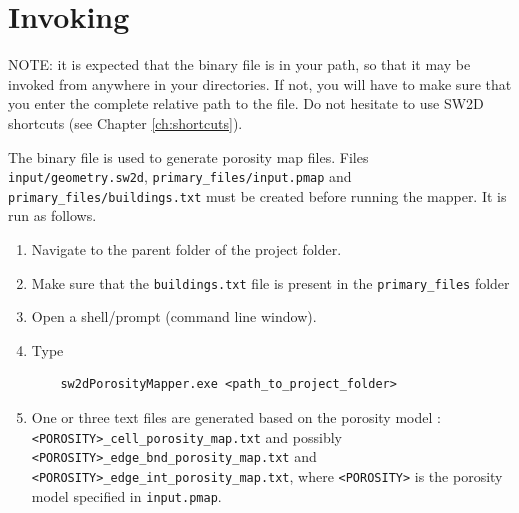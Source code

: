 \section{Invoking \swPorosityMapper}
NOTE: it is expected that the binary file \swPorosityMapper is in your path, so that it may be invoked from anywhere in your directories. If not, you will have to make sure that you enter the complete relative path to the \swPorosityMapper file. Do not hesitate to use SW2D shortcuts (see Chapter \ref{ch:shortcuts}).

The \swPorosityMapper binary file is used to generate porosity map files.
Files \texttt{input/geometry.sw2d}, \texttt{primary\_files/input.pmap} and \texttt{primary\_files/buildings.txt} must be created before running the mapper.
It is run as follows.

\begin{enumerate}
	\item Navigate to the parent folder of the \swdd project folder.
	\item Make sure that the \texttt{buildings.txt} file is present in the \texttt{primary\_files} folder
	\item Open a shell/prompt (command line window).
	\item Type
	\begin{verbatim}
	sw2dPorosityMapper.exe <path_to_project_folder>
	\end{verbatim}
	\item One or three text files are generated based on the porosity model : \texttt{<POROSITY>\_cell\_porosity\_map.txt} and possibly \texttt{<POROSITY>\_edge\_bnd\_porosity\_map.txt} and \texttt{<POROSITY>\_edge\_int\_porosity\_map.txt}, where \texttt{<POROSITY>} is the porosity model specified in \texttt{input.pmap}.
	\end{enumerate}
